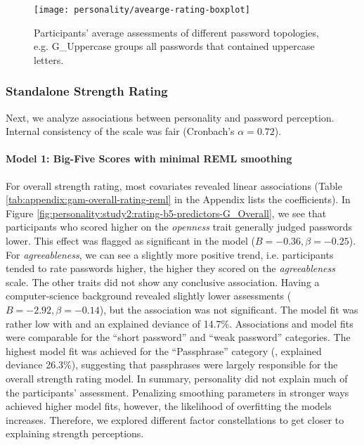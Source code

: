 \begin{figure}[htbp]
	\centering
	\texttt{[image: personality/avearge-rating-boxplot]}
	\caption{\label{fig:personality:study2:average-rating-boxplot}Participants' average assessments of different password topologies, e.g. G\_Uppercase groups all passwords that contained uppercase letters.}
\end{figure}

%

\subsubsection{Standalone Strength Rating}
Next, we analyze associations between personality and password perception. Internal consistency of the scale was fair (Cronbach's $\alpha=0.72$). 

\paragraph{Model 1: Big-Five Scores with minimal REML smoothing}
For overall strength rating, most covariates revealed linear associations (Table \ref{tab:appendix:gam-overall-rating-reml} in the Appendix lists the coefficients). In Figure \ref{fig:personality:study2:rating-b5-predictors-G_Overall}, we see that participants who scored higher on the \textit{openness} trait generally judged passwords lower. This effect was flagged as significant in the model ($B=-0.36, \beta=-0.25$). For \textit{agreeableness}, we can see a slightly more positive trend, i.e. participants tended to rate passwords higher, the higher they scored on the \textit{agreeableness} scale. The other traits did not show any conclusive association. Having a computer-science background revealed slightly lower assessments ($B=-2.92, \beta=-0.14$), but the association was not significant. The model fit was rather low with  and an explained deviance of 14.7\%. Associations and model fits were comparable for the ``short password'' and ``weak password'' categories. The highest model fit was achieved for the ``Passphrase'' category (, explained deviance 26.3\%), suggesting that passphrases were largely responsible for the overall strength rating model. In summary, personality did not explain much of the participants' assessment. Penalizing smoothing parameters in stronger ways achieved higher model fits, however, the likelihood of overfitting the models increases. Therefore, we explored different factor constellations to get closer to explaining strength perceptions.

